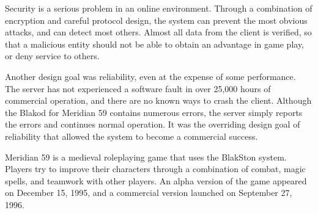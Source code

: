 Security is a serious problem in an online environment.  Through a
combination of encryption and careful protocol design, the system can
prevent the most obvious attacks, and can detect most others.  Almost
all data from the client is verified, so that a malicious entity
should not be able to obtain an advantage in game play, or deny
service to others.

Another design goal was reliability, even at the expense of some
performance.  The server has not experienced a software fault in over
25,000 hours of commercial operation, and there are no known ways to
crash the client.  Although the Blakod for Meridian 59 contains
numerous errors, the server simply reports the errors and continues
normal operation.  It was the overriding design goal of reliability
that allowed the system to become a commercial success.

Meridian 59 is a medieval roleplaying game that uses the BlakSton
system.  Players try to improve their characters through a combination
of combat, magic spells, and teamwork with other players.  An alpha
version of the game appeared on December 15, 1995, and a commercial
version launched on September 27, 1996.

